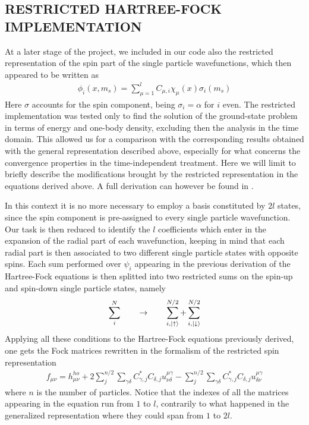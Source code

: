 \subsection{RESTRICTED HARTREE-FOCK IMPLEMENTATION}
\label{sec:restricted_HF}
At a later stage of the project, we included in our code also the restricted representation of the spin part of the single particle wavefunctions, which then appeared to be written as
\begin{align}
    \phi_i(x,m_s) = \sum_{\mu=1}^{l} C_{\mu,i} \chi_\mu(x) \sigma_{i}(m_s)
    \label{eq:expansion_spf_res}
\end{align}
Here $\sigma$ accounts for the spin component, being $\sigma_i=\alpha$ for $i$ even. The restricted implementation was tested only to find the solution of the ground-state problem in terms of energy and one-body density, excluding then the analysis in the time domain. This allowed us for a comparison with the corresponding results obtained with the general representation described above, especially for what concerns the convergence properties in the time-independent treatment. Here we will limit to briefly describe the modifications brought by the restricted representation in the equations derived above. A full derivation can however be found in \cite{modern_qc}. 

In this context it is no more necessary to employ a basis constituted by $2l$ states, since the spin component is pre-assigned to every single particle wavefunction. Our task is then reduced to identify the $l$ coefficients which enter in the expansion of the radial part of each wavefunction, keeping in mind that each radial part is then associated to two different single particle states with opposite spins. Each sum performed over $\psi_i$ appearing in the previous derivation of the Hartree-Fock equations is then splitted into two restricted sums on the spin-up and spin-down single particle states, namely
\begin{align*}
    \sum_i^N \qquad \rightarrow \qquad \sum_{i,\ket{\uparrow}}^{N/2} + \sum_{i,\ket{\downarrow}}^{N/2}
\end{align*}
Applying all these conditions to the Hartree-Fock equations previously derived, one gets the Fock matrices rewritten in the formalism of the restricted spin representation
\begin{align*}
    f_{\mu\nu} =  h_{\mu\nu}^{ho} + 2\sum_{j}^{n/2} \sum_{\gamma\delta} C_{\gamma,j}^* C_{\delta,j} u^{\mu\gamma}_{\nu\delta} - \sum_{j}^{n/2} \sum_{\gamma\delta} C_{\gamma,j}^* C_{\delta,j} u^{\mu\gamma}_{\delta\nu}
\end{align*}
where $n$ is the number of particles. Notice that the indexes of all the matrices appearing in the equation run from $1$ to $l$, contrarily to what happened in the generalized representation where they could span from $1$ to $2l$. 

